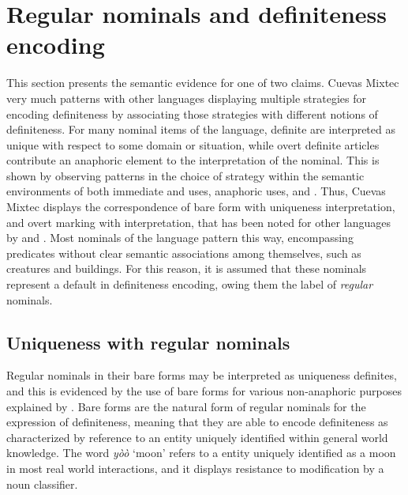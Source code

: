 \documentclass[output=paper,modfonts,nonflat]{langsci/langscibook}
\begin{document}
\section{Regular nominals and definiteness encoding} \label{sec:cisneros:4}

This section presents the semantic evidence for one of two claims.  Cuevas Mixtec very much patterns with other languages displaying multiple strategies for encoding definiteness by associating those strategies with different notions of definiteness.  For many nominal items of the language, definite  are interpreted as unique with respect to some domain or situation, while overt definite articles contribute an anaphoric element to the interpretation of the nominal.  This is shown by observing patterns in the choice of  strategy within the semantic environments of both immediate and  uses, anaphoric uses, and .  Thus, Cuevas Mixtec displays the correspondence of bare form with uniqueness interpretation, and overt marking with  interpretation, that has been noted for other languages by \citet{Schwarz2013} and \citet{Jenks2015}.  Most nominals of the language pattern this way, encompassing predicates without clear semantic associations among themselves, such as creatures and buildings.  For this reason, it is assumed that these nominals represent a default in definiteness encoding, owing them the label of \textit{regular} nominals.

\subsection{Uniqueness with regular nominals} \label{sec:cisneros:4.1}

Regular nominals in their bare forms may be interpreted as uniqueness definites, and this is evidenced by the use of bare forms for various non-anaphoric purposes explained by \citet{Hawkins1978}. Bare forms are the natural form of regular nominals for the expression of  definiteness, meaning that they are able to encode definiteness as characterized by reference to an entity uniquely identified within general world knowledge.  The word \textit{y\`o\`o} `moon' refers to a entity uniquely identified as a moon in most real world interactions, and it displays resistance to modification by a noun classifier.
\end{document}
